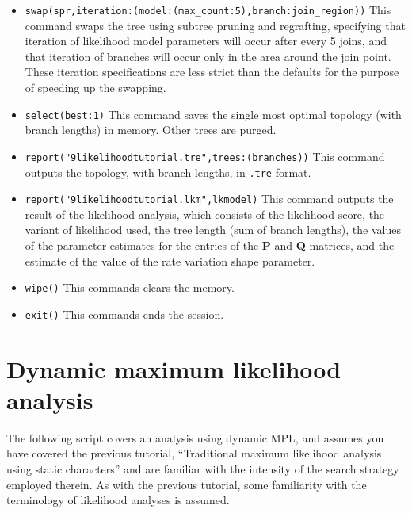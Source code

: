 \begin{itemize}
\item \texttt{swap(spr,iteration:(model:(max\_count:5),branch:join\_region))} This command swaps the tree using subtree pruning and regrafting, specifying that iteration of likelihood model parameters will occur after every 5 joins, and that iteration of branches will occur only in the area around the join point. These iteration specifications are less strict than the defaults for the purpose of speeding up the swapping.
\item \texttt{select(best:1)} This command saves the single most optimal topology (with branch lengths) in memory. Other trees are purged.
\item \texttt{report("9likelihoodtutorial.tre",trees:(branches))} This command outputs the topology, with branch lengths, in \texttt{.tre} format.
\item \texttt{report("9likelihoodtutorial.lkm",lkmodel)} This command outputs the result of the likelihood analysis, which consists of the likelihood score, the variant of likelihood used, the tree length (sum of branch lengths), the values of the parameter estimates for the entries of the \textbf{P} and \textbf{Q} matrices, and the estimate of the value of the rate variation shape parameter.
\item \texttt{wipe()} This commands clears the memory.
\item \texttt{exit()} This commands ends the \poy session.
\end{itemize}

\section{Dynamic maximum likelihood analysis}{\label{tutorial11}}
The following script covers an analysis using dynamic MPL, and assumes you have covered the previous tutorial, ``Traditional maximum likelihood analysis using static characters'' and are familiar with the intensity of the search strategy employed therein. As with the previous tutorial, some familiarity with the terminology of likelihood analyses is assumed.

